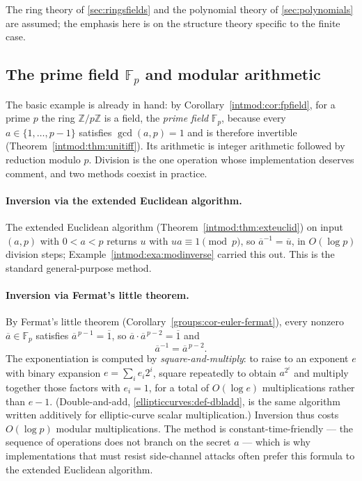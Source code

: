 \documentclass[11pt,a4paper]{article}
\theoremstyle{definition}
\theoremstyle{remark}
\newcommand{\Z}{\ensuremath{\mathbb{Z}}}
\newcommand{\Fp}{\ensuremath{\mathbb{F}_{p}}}
\begin{document}
The ring theory of \cref{sec:ringsfields} and the polynomial theory of \cref{sec:polynomials} are assumed; the emphasis here is on the structure theory specific to the finite case.

\subsection{The prime field \texorpdfstring{\(\Fp\)}{Fp} and modular arithmetic}
\label{finitefields:subsec:primefield}

The basic example is already in hand: by Corollary~\ref{intmod:cor:fpfield}, for a prime \(p\) the ring \(\Z/p\Z\) is a field, the \emph{prime field} \(\Fp\), because every \(a \in \{1,\dots,p-1\}\) satisfies \(\gcd(a,p)=1\) and is therefore invertible (Theorem~\ref{intmod:thm:unitiff}). Its arithmetic is integer arithmetic followed by reduction modulo \(p\). Division is the one operation whose implementation deserves comment, and two methods coexist in practice.

\paragraph{Inversion via the extended Euclidean algorithm.}
The extended Euclidean algorithm (Theorem~\ref{intmod:thm:exteuclid}) on input \((a, p)\) with \(0 < a < p\) returns \(u\) with \(ua \equiv 1 \pmod p\), so \(\overline a^{-1} = \overline u\), in \(O(\log p)\) division steps; Example~\ref{intmod:exa:modinverse} carried this out. This is the standard general-purpose method.

\paragraph{Inversion via Fermat's little theorem.}
By Fermat's little theorem (Corollary~\ref{groups:cor-euler-fermat}), every nonzero \(\overline a \in \Fp\) satisfies \(\overline a^{\,p-1} = \overline 1\), so \(\overline a \cdot \overline a^{\,p-2} = \overline 1\) and
\[
  \overline a^{-1} = \overline a^{\,p-2}.
\]
The exponentiation is computed by \emph{square-and-multiply}: to raise to an exponent \(e\) with binary expansion \(e = \sum_i e_i 2^i\), square repeatedly to obtain \(a^{2^i}\) and multiply together those factors with \(e_i = 1\), for a total of \(O(\log e)\) multiplications rather than \(e - 1\). (Double-and-add, \cref{ellipticcurves:def-dbladd}, is the same algorithm written additively for elliptic-curve scalar multiplication.) Inversion thus costs \(O(\log p)\) modular multiplications. The method is constant-time-friendly --- the sequence of operations does not branch on the secret \(a\) --- which is why implementations that must resist side-channel attacks often prefer this formula to the extended Euclidean algorithm.
\end{document}
